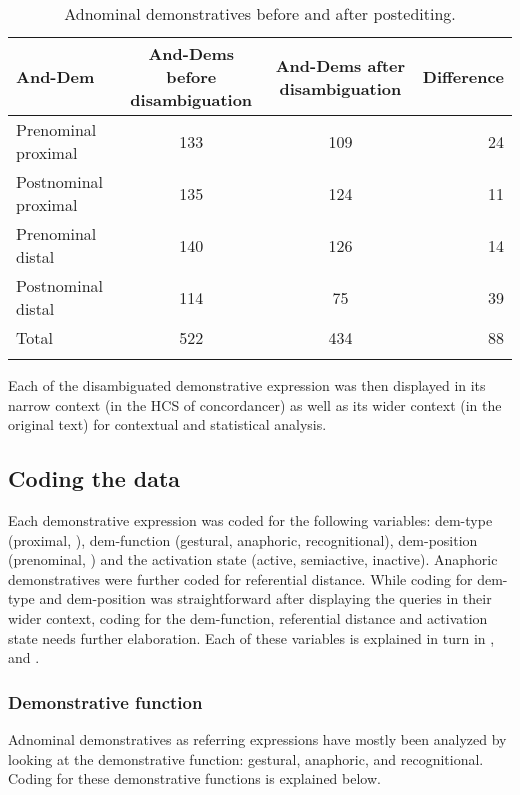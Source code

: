 \documentclass[output=paper,
modfonts
]{langscibook}
\begin{document}
\begin{table}
\begin{tabularx}{\textwidth}{lSSr}
\lsptoprule
{\bfseries And-Dem} & {\bfseries And-Dems before disambiguation} & {\bfseries And-Dems after disambiguation} & {\bfseries Difference}\\
\midrule
{ Prenominal proximal} & { 133} & { 109} & { 24}\\
{ Postnominal proximal} & { 135} & { 124} & { 11}\\
{ Prenominal distal} & { 140} & { 126} & { 14}\\
{ Postnominal distal} & { 114} & { 75} & { 39}\\
{ Total} & { 522} & { 434} & { 88}\\
\lspbottomrule
\end{tabularx}

\caption{Adnominal demonstratives before and after postediting.}
\label{tab:mwamzandi:2}
\end{table}

Each of the disambiguated demonstrative expression was then displayed in its narrow context (in the HCS of  concordancer) as well as its wider context (in the original text) for contextual and statistical analysis.

\subsection{Coding the data}\label{sec:mwamzandi:2.2}

Each demonstrative expression was coded for the following variables: dem-type (proximal, ), dem-function (gestural, anaphoric, recognitional), dem-position (prenominal, ) and the activation state (active, semiactive, inactive). Anaphoric demonstratives were further coded for referential distance. While coding for dem-type and dem-position was straightforward after displaying the queries in their wider context, coding for the dem-function, referential distance and activation state needs further elaboration. Each of these variables is explained in turn in ,  and .

\subsubsection{Demonstrative function}\label{sec:mwamzandi:2.2.1}

Adnominal demonstratives as referring expressions have mostly been analyzed by looking at the demonstrative function: gestural, anaphoric, and recognitional. Coding for these demonstrative functions is explained below.
\end{document}
